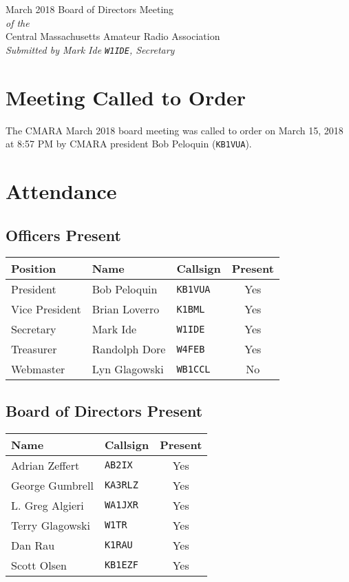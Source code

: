 \documentclass[10pt,letterpaper]{article}
\begin{document}
\begin{center}
{\huge March 2018 Board of Directors Meeting}\\
\emph{of the}\\
{\Large Central Massachusetts Amateur Radio Association}\\
\emph{Submitted by Mark Ide \texttt{W1IDE}, Secretary}
\end{center}

\section{Meeting Called to Order}
The CMARA March 2018 board meeting was called to order on March 15, 2018 at 8:57 PM by CMARA president Bob Peloquin (\texttt{KB1VUA}).

\section{Attendance}

\subsection{Officers Present}
\begin{tabular}{|l|l|l|c|}
  \hline
  \textbf{Position} & \textbf{Name}  & \textbf{Callsign} & \textbf{Present} \\ \hline
  President         & Bob Peloquin   & \texttt{KB1VUA}   & Yes \\
  Vice President    & Brian Loverro  & \texttt{K1BML}    & Yes \\
  Secretary         & Mark Ide       & \texttt{W1IDE}    & Yes \\
  Treasurer         & Randolph Dore  & \texttt{W4FEB}    & Yes \\
  Webmaster         & Lyn Glagowski  & \texttt{WB1CCL}   & No  \\
  \hline
\end{tabular}

\subsection{Board of Directors Present}
\begin{tabular}{|l|l|c|}
  \hline
  \textbf{Name}   & \textbf{Callsign} & \textbf{Present} \\ \hline
  Adrian Zeffert  & \texttt{AB2IX}    &  Yes \\ \hline
  George Gumbrell & \texttt{KA3RLZ}   &  Yes \\ \hline
  L. Greg Algieri & \texttt{WA1JXR}   &  Yes \\ \hline
  Terry Glagowski & \texttt{W1TR}     &  Yes \\ \hline
  Dan Rau         & \texttt{K1RAU}    &  Yes \\ \hline
  Scott Olsen     & \texttt{KB1EZF}   &  Yes \\ \hline
\end{tabular}\\
\end{document}
